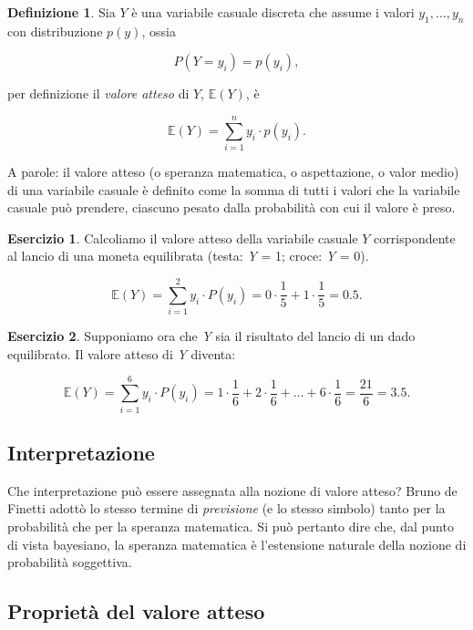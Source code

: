 \documentclass[
  11pt,
]{krantz}
\newcommand{\E}{\mathbb{E}} %
\theoremstyle{definition}
\newtheorem{definition}{Definizione}[chapter]
\theoremstyle{definition}
\theoremstyle{definition}
\newtheorem{exercise}{Esercizio}[chapter]
\theoremstyle{definition}
\theoremstyle{remark}
\begin{document}
\begin{definition}
Sia \(Y\) è una variabile casuale discreta che assume i valori \(y_1, \dots, y_n\) con distribuzione \(p(y)\), ossia

\[
P(Y = y_i) = p(y_i),
\]

per definizione il \emph{valore atteso} di \(Y\), \(\E(Y)\), è

\begin{equation}
\E(Y) = \sum_{i=1}^n y_i \cdot p(y_i).
\label{eq:expval-discr}
\end{equation}
\end{definition}

A parole: il valore atteso (o speranza matematica, o aspettazione, o valor medio) di una variabile casuale è definito come la somma di tutti i valori che la variabile casuale può prendere, ciascuno pesato dalla probabilità con cui il valore è preso.

\begin{exercise}
Calcoliamo il valore atteso della variabile casuale \(Y\) corrispondente al lancio di una moneta equilibrata (testa: \emph{Y} = 1; croce: \emph{Y} = 0).

\[
\E(Y) = \sum_{i=1}^{2} y_i \cdot P(y_i) = 0 \cdot \frac{1}{5} + 1 \cdot \frac{1}{5} = 0.5.
\]
\end{exercise}

\begin{exercise}
Supponiamo ora che \emph{Y} sia il risultato del lancio di un dado equilibrato. Il valore atteso di \emph{Y} diventa:

\[
\E(Y) = \sum_{i=1}^{6} y_i \cdot P(y_i) = 1 \cdot \frac{1}{6} + 2 \cdot \frac{1}{6} + \dots + 6 \cdot \frac{1}{6} = \frac{21}{6} = 3.5.
\]
\end{exercise}

\hypertarget{interpretazione}{%
\subsection{Interpretazione}\label{interpretazione}}

Che interpretazione può essere assegnata alla nozione di valore atteso? Bruno de Finetti adottò lo stesso termine di \emph{previsione} (e lo stesso simbolo) tanto per la probabilità che per la speranza matematica. Si può pertanto dire che, dal punto di vista bayesiano, la speranza matematica è l'estensione naturale della nozione di probabilità soggettiva.

\hypertarget{proprietuxe0-del-valore-atteso}{%
\subsection{Proprietà del valore atteso}\label{proprietuxe0-del-valore-atteso}}
\end{document}
